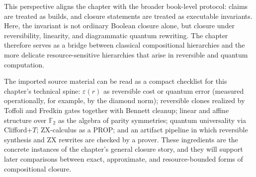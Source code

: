 This perspective aligns the chapter with the broader book-level protocol: claims are treated as builds, and closure statements are treated as executable invariants. Here, the invariant is not ordinary Boolean closure alone, but closure under reversibility, linearity, and diagrammatic quantum rewriting. The chapter therefore serves as a bridge between classical compositional hierarchies and the more delicate resource-sensitive hierarchies that arise in reversible and quantum computation.

The imported source material can be read as a compact checklist for this chapter’s technical spine: \(\varepsilon(r)\) as reversible cost or quantum error (measured operationally, for example, by the diamond norm); reversible clones realized by Toffoli and Fredkin gates together with Bennett cleanup; linear and affine structure over \(\mathbb{F}_2\) as the algebra of parity symmetries; quantum universality via Clifford+\(T\); ZX-calculus as a PROP; and an artifact pipeline in which reversible synthesis and ZX rewrites are checked by a prover. These ingredients are the concrete instances of the chapter’s general closure story, and they will support later comparisons between exact, approximate, and resource-bounded forms of compositional closure.
